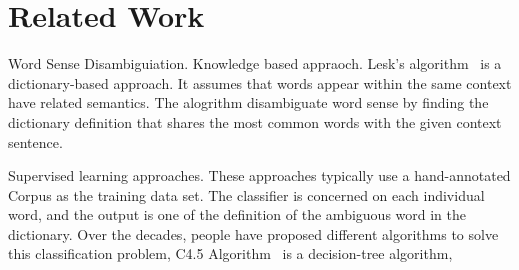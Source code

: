 \section{Related Work}

Word Sense Disambiguiation. Knowledge based appraoch.
Lesk's algorithm~\cite{lesk1986automatic} is a
dictionary-based approach. It assumes that words appear within the same context
have related semantics. The alogrithm disambiguate word sense by finding the
dictionary definition that shares the most common words with the given context
sentence.

Supervised learning approaches. These approaches typically use a hand-annotated
Corpus as the training data set. The classifier is concerned on each individual
word, and the output is one of the definition of the ambiguous word in the
dictionary. Over the decades, people have proposed different algorithms to solve
this classification problem, C4.5 Algorithm~\cite{quinlan1986induction} is a decision-tree
algorithm,  
